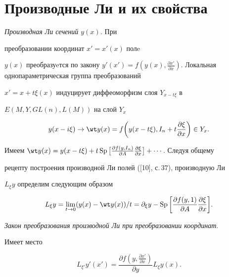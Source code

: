 \section{Производные Ли и их свойства}





{\it Производная Ли сечений $y(x)$.} При


преобразовании координат $x'=x'(x)$ полe


$y(x)$ преобразуeтся по закону $y'(x')=f(y(x),\frac{\partial x'}


{\partial x})$. Локальная однопараметрическая группа преобразований


$x'=x+t\xi(x)$ индуцирует диффеоморфизм слоя $Y_{x-t\xi}$ в


$E(M,Y,GL(n),L(M))$ на слой $Y_x$


$$


y(x-i\xi) \to \wt y(x)=f\bigg(y(x-t\xi),I_n+t\frac{\partial \xi}


{\partial x}\bigg)\in Y_x.


$$


Имеем $\wt y(x)=y(x-t\xi)+t\SP\big[\frac{\partial f(y,I_n)}


{\partial A}\frac{\partial \xi}{\partial x}\big]+\dotsb$. Следуя общему 


рецепту построения производной Ли полей ([10], с.\,37), производную Ли


$L_\xi y$ определим следующим образом


$$


L_\xi y=\lim_{t\to 0}(y(x)-\wt y(x))/t=\partial_\xi y-


\SP\bigg[\frac{\partial f(y,1)}


{\partial A}\frac{\partial \xi}{\partial x}\bigg].


$$





{\it Закон преобразования производной Ли при преобразовании координат}.





\begin{thm}


Имеет место


$$


L_{\xi'}y'(x')=\frac{\partial f(y,\frac{\partial x'}{\partial x})}


{\partial y}L_\xi y(x).


$$


\end{thm}





